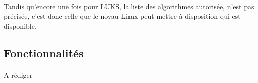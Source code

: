 \paragraph{}
Tandis qu'encore une fois pour LUKS, la liste des algorithmes autorisée, n'est 
pas précisée, c'est donc celle que le noyau Linux peut mettre à disposition 
qui est disponible.

\subsection{Fonctionnalités}
\paragraph*{} A rédiger
